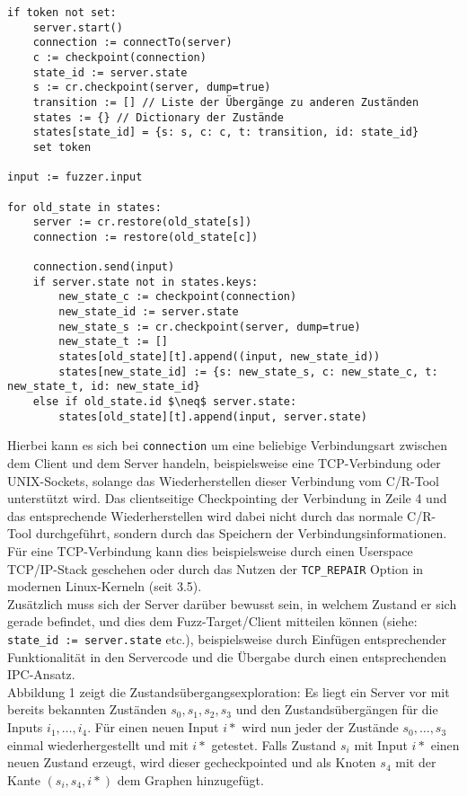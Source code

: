 \documentclass[a4paper]{article}
\begin{document}
\begin{lstlisting}[mathescape, caption=Fuzz-Target zur Exploration des Zustandsgraphen]
if token not set:
    server.start()
    connection := connectTo(server)
    c := checkpoint(connection)
    state_id := server.state
    s := cr.checkpoint(server, dump=true)
    transition := [] // Liste der Übergänge zu anderen Zuständen
    states := {} // Dictionary der Zustände
    states[state_id] = {s: s, c: c, t: transition, id: state_id}
    set token

input := fuzzer.input

for old_state in states:
    server := cr.restore(old_state[s])
    connection := restore(old_state[c])

    connection.send(input)
    if server.state not in states.keys:
        new_state_c := checkpoint(connection)
        new_state_id := server.state
        new_state_s := cr.checkpoint(server, dump=true)
        new_state_t := []
        states[old_state][t].append((input, new_state_id))
        states[new_state_id] := {s: new_state_s, c: new_state_c, t: new_state_t, id: new_state_id}
    else if old_state.id $\neq$ server.state:
        states[old_state][t].append(input, server.state)
\end{lstlisting}
Hierbei kann es sich bei \texttt{connection} um eine beliebige Verbindungsart zwischen dem Client und dem Server handeln, beispielsweise eine TCP-Verbindung oder UNIX-Sockets, solange das Wiederherstellen dieser Verbindung vom C/R-Tool unterstützt wird. Das clientseitige Checkpointing der Verbindung in Zeile 4 und das entsprechende Wiederherstellen wird dabei nicht durch das normale C/R-Tool durchgeführt, sondern durch das Speichern der Verbindungsinformationen. Für eine TCP-Verbindung kann dies beispielsweise durch einen Userspace TCP/IP-Stack geschehen oder durch das Nutzen der \texttt{TCP\_REPAIR} Option in modernen Linux-Kerneln (seit 3.5).\\
Zusätzlich muss sich der Server darüber bewusst sein, in welchem Zustand er sich gerade befindet, und dies dem Fuzz-Target/Client mitteilen können (siehe: \texttt{state\_id := server.state} etc.), beispielsweise durch Einfügen entsprechender Funktionalität in den Servercode und die Übergabe durch einen entsprechenden IPC-Ansatz.\\
Abbildung 1 zeigt die Zustandsübergangsexploration: Es liegt ein Server vor mit bereits bekannten Zuständen $s_0, s_1, s_2, s_3$ und den Zustandsübergängen für die Inputs $i_1, \dots, i_4$. Für einen neuen Input $i*$ wird nun jeder der Zustände $s_0, \dots, s_3$ einmal wiederhergestellt und mit $i*$ getestet. Falls Zustand $s_i$ mit Input $i*$ einen neuen Zustand erzeugt, wird dieser gecheckpointed und als Knoten $s_4$ mit der Kante $(s_i, s_4, i*)$ dem Graphen hinzugefügt.
\end{document}
